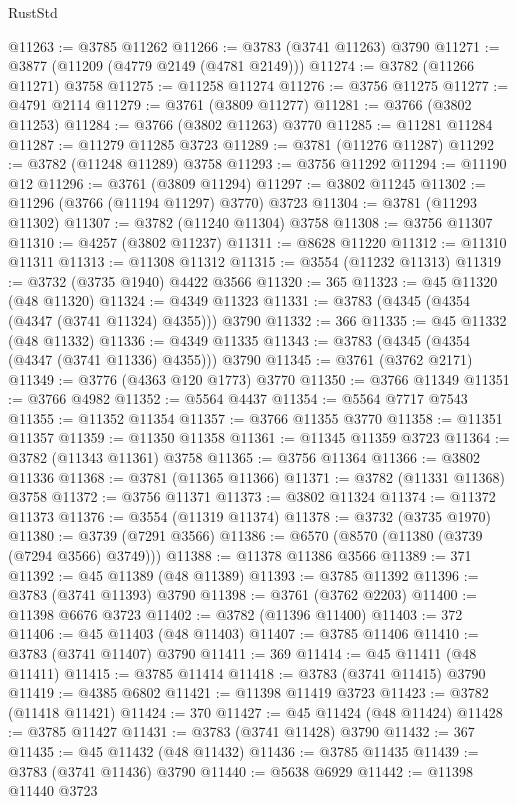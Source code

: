 \begin{lexlean}{RustStd}
\begin{coremodule}
@11263 := @3785 @11262
@11266 := @3783 (@3741 @11263) @3790
@11271 := @3877 (@11209 (@4779 @2149 (@4781 @2149)))
@11274 := @3782 (@11266 @11271) @3758
@11275 := @11258 @11274
@11276 := @3756 @11275
@11277 := @4791 @2114
@11279 := @3761 (@3809 @11277)
@11281 := @3766 (@3802 @11253)
@11284 := @3766 (@3802 @11263) @3770
@11285 := @11281 @11284
@11287 := @11279 @11285 @3723
@11289 := @3781 (@11276 @11287)
@11292 := @3782 (@11248 @11289) @3758
@11293 := @3756 @11292
@11294 := @11190 @12
@11296 := @3761 (@3809 @11294)
@11297 := @3802 @11245
@11302 := @11296 (@3766 (@11194 @11297) @3770) @3723
@11304 := @3781 (@11293 @11302)
@11307 := @3782 (@11240 @11304) @3758
@11308 := @3756 @11307
@11310 := @4257 (@3802 @11237)
@11311 := @8628 @11220
@11312 := @11310 @11311
@11313 := @11308 @11312
@11315 := @3554 (@11232 @11313)
@11319 := @3732 (@3735 @1940) @4422 @3566
@11320 := 365
@11323 := @45 @11320 (@48 @11320)
@11324 := @4349 @11323
@11331 := @3783 (@4345 (@4354 (@4347 (@3741 @11324) @4355))) @3790
@11332 := 366
@11335 := @45 @11332 (@48 @11332)
@11336 := @4349 @11335
@11343 := @3783 (@4345 (@4354 (@4347 (@3741 @11336) @4355))) @3790
@11345 := @3761 (@3762 @2171)
@11349 := @3776 (@4363 @120 @1773) @3770
@11350 := @3766 @11349
@11351 := @3766 @4982
@11352 := @5564 @4437
@11354 := @5564 @7717 @7543
@11355 := @11352 @11354
@11357 := @3766 @11355 @3770
@11358 := @11351 @11357
@11359 := @11350 @11358
@11361 := @11345 @11359 @3723
@11364 := @3782 (@11343 @11361) @3758
@11365 := @3756 @11364
@11366 := @3802 @11336
@11368 := @3781 (@11365 @11366)
@11371 := @3782 (@11331 @11368) @3758
@11372 := @3756 @11371
@11373 := @3802 @11324
@11374 := @11372 @11373
@11376 := @3554 (@11319 @11374)
@11378 := @3732 (@3735 @1970)
@11380 := @3739 (@7291 @3566)
@11386 := @6570 (@8570 (@11380 (@3739 (@7294 @3566) @3749)))
@11388 := @11378 @11386 @3566
@11389 := 371
@11392 := @45 @11389 (@48 @11389)
@11393 := @3785 @11392
@11396 := @3783 (@3741 @11393) @3790
@11398 := @3761 (@3762 @2203)
@11400 := @11398 @6676 @3723
@11402 := @3782 (@11396 @11400)
@11403 := 372
@11406 := @45 @11403 (@48 @11403)
@11407 := @3785 @11406
@11410 := @3783 (@3741 @11407) @3790
@11411 := 369
@11414 := @45 @11411 (@48 @11411)
@11415 := @3785 @11414
@11418 := @3783 (@3741 @11415) @3790
@11419 := @4385 @6802
@11421 := @11398 @11419 @3723
@11423 := @3782 (@11418 @11421)
@11424 := 370
@11427 := @45 @11424 (@48 @11424)
@11428 := @3785 @11427
@11431 := @3783 (@3741 @11428) @3790
@11432 := 367
@11435 := @45 @11432 (@48 @11432)
@11436 := @3785 @11435
@11439 := @3783 (@3741 @11436) @3790
@11440 := @5638 @6929
@11442 := @11398 @11440 @3723

\end{coremodule}
\end{lexlean}
